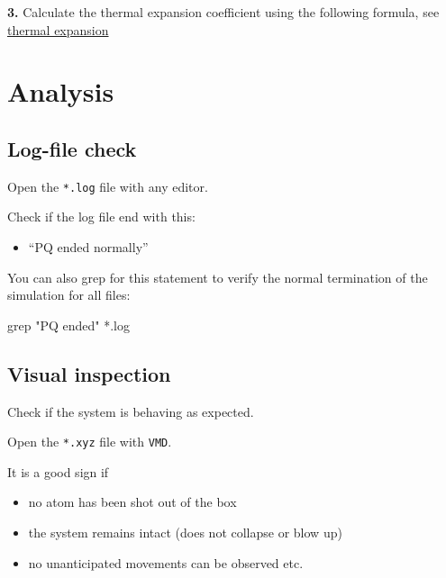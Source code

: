 \documentclass[
  letterpaper,
]{article}
\newenvironment{Shaded}{\begin{snugshade}}{\end{snugshade}}
\newcommand{\NormalTok}[1]{\textcolor[rgb]{0.00,0.23,0.31}{#1}}
\providecommand{\tightlist}{%
  \setlength{\itemsep}{0pt}\setlength{\parskip}{0pt}}\usepackage{longtable,booktabs,array}
\begin{document}
\textbf{3.} Calculate the thermal expansion coefficient using the
following formula, see
\protect\hyperlink{linear--volumetric-thermal-expansion-coefficient}{thermal
expansion}

\hypertarget{analysis-1}{%
\section{Analysis}\label{analysis-1}}

\hypertarget{log-file-check}{%
\subsection{Log-file check}\label{log-file-check}}

Open the \texttt{*.log} file with any editor.

Check if the log file end with this:

\begin{itemize}
\tightlist
\item[$\square$]
  ``PQ ended normally''
\end{itemize}

You can also grep for this statement to verify the normal termination of
the simulation for all files:

\begin{Shaded}
\begin{Highlighting}[]
\NormalTok{grep "PQ ended" *.log}
\end{Highlighting}
\end{Shaded}

\hypertarget{visual-inspection}{%
\subsection{Visual inspection}\label{visual-inspection}}

Check if the system is behaving as expected.

Open the \texttt{*.xyz} file with \texttt{VMD}.

It is a good sign if

\begin{itemize}
\item[$\square$]
  no atom has been shot out of the box
\item[$\square$]
  the system remains intact (does not collapse or blow up)
\item[$\square$]
  no unanticipated movements can be observed etc.
\end{itemize}
\end{document}
